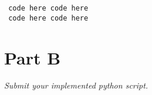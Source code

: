 \documentclass[12pt,twoside]{article}
\begin{document}
\begin{problems}
\begin{problemparts}
\texttt { code here code here\\
\
 code here code here }


\problempart
\end{problemparts}

\section*{Part B}
\problem  %
\begin{problemparts}
\emph{Submit your implemented python script.}
\problempart
\problempart
\problempart
\problempart
\problempart
\end{problemparts}
\end{problems}
\end{document}

